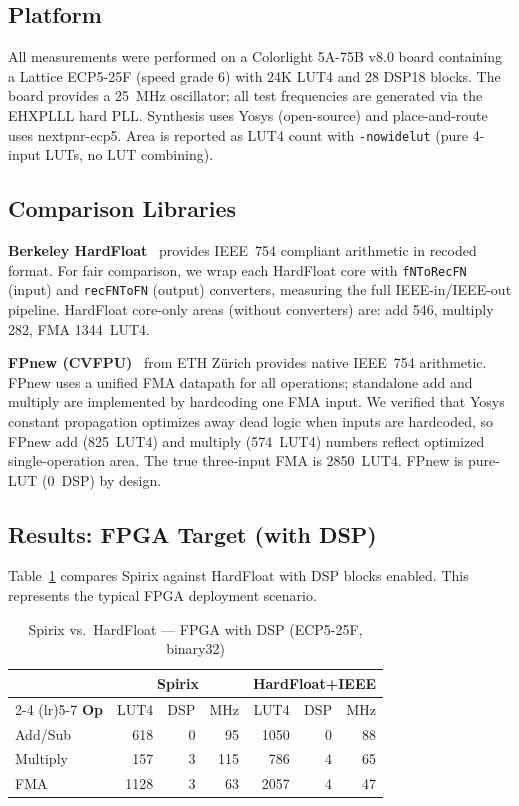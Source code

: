 \documentclass[10pt,twocolumn]{article}
\begin{document}
\subsection{Platform}

All measurements were performed on a Colorlight 5A-75B v8.0 board
containing a Lattice ECP5-25F (speed grade 6) with 24K LUT4 and
28 DSP18 blocks.  The board provides a 25~MHz oscillator; all test
frequencies are generated via the EHXPLLL hard PLL.  Synthesis uses
Yosys (open-source) and place-and-route uses nextpnr-ecp5.  Area
is reported as LUT4 count with \texttt{-nowidelut} (pure 4-input
LUTs, no LUT combining).

\subsection{Comparison Libraries}

\textbf{Berkeley HardFloat}~\cite{hardFloat} provides IEEE~754
compliant arithmetic in recoded format.  For fair comparison, we
wrap each HardFloat core with \texttt{fNToRecFN} (input) and
\texttt{recFNToFN} (output) converters, measuring the full
IEEE-in/IEEE-out pipeline.  HardFloat core-only areas (without
converters) are: add 546, multiply 282, FMA 1344~LUT4.

\textbf{FPnew (CVFPU)}~\cite{fpnew} from ETH Z\"urich provides
native IEEE~754 arithmetic.  FPnew uses a unified FMA datapath
for all operations; standalone add and multiply are implemented by
hardcoding one FMA input.  We verified that Yosys constant
propagation optimizes away dead logic when inputs are hardcoded,
so FPnew add (825~LUT4) and multiply (574~LUT4) numbers reflect
optimized single-operation area.  The true three-input FMA is
2850~LUT4.  FPnew is pure-LUT (0~DSP) by design.

\subsection{Results: FPGA Target (with DSP)}

Table~\ref{tab:dsp} compares Spirix against HardFloat with DSP
blocks enabled.  This represents the typical FPGA deployment scenario.

\begin{table}[t]
\centering
\caption{Spirix vs.\ HardFloat --- FPGA with DSP (ECP5-25F, binary32)}
\label{tab:dsp}
\small
\begin{tabular}{@{}l rr r rr r@{}}
\toprule
 & \multicolumn{3}{c}{\textbf{Spirix}} & \multicolumn{3}{c}{\textbf{HardFloat+IEEE}} \\
\cmidrule(lr){2-4} \cmidrule(lr){5-7}
\textbf{Op} & LUT4 & DSP & MHz & LUT4 & DSP & MHz \\
\midrule
Add/Sub & 618 & 0 & 95 & 1050 & 0 & 88 \\
Multiply & 157 & 3 & 115 & 786 & 4 & 65 \\
FMA & 1128 & 3 & 63 & 2057 & 4 & 47 \\
\bottomrule
\end{tabular}
\end{table}
\end{document}
